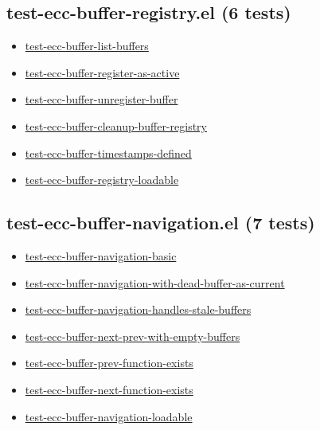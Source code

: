 \documentclass[11pt]{article}
\begin{document}
\subsection{test-ecc-buffer-registry.el (6 tests)}
\label{sec:orge17050b}
\begin{itemize}
\item \href{test-ecc-buffer-registry.el}{test-ecc-buffer-list-buffers}
\item \href{test-ecc-buffer-registry.el}{test-ecc-buffer-register-as-active}
\item \href{test-ecc-buffer-registry.el}{test-ecc-buffer-unregister-buffer}
\item \href{test-ecc-buffer-registry.el}{test-ecc-buffer-cleanup-buffer-registry}
\item \href{test-ecc-buffer-registry.el}{test-ecc-buffer-timestamps-defined}
\item \href{test-ecc-buffer-registry.el}{test-ecc-buffer-registry-loadable}
\end{itemize}
\subsection{test-ecc-buffer-navigation.el (7 tests)}
\label{sec:org1b0099a}
\begin{itemize}
\item \href{test-ecc-buffer-navigation.el}{test-ecc-buffer-navigation-basic}
\item \href{test-ecc-buffer-navigation.el}{test-ecc-buffer-navigation-with-dead-buffer-as-current}
\item \href{test-ecc-buffer-navigation.el}{test-ecc-buffer-navigation-handles-stale-buffers}
\item \href{test-ecc-buffer-navigation.el}{test-ecc-buffer-next-prev-with-empty-buffers}
\item \href{test-ecc-buffer-navigation.el}{test-ecc-buffer-prev-function-exists}
\item \href{test-ecc-buffer-navigation.el}{test-ecc-buffer-next-function-exists}
\item \href{test-ecc-buffer-navigation.el}{test-ecc-buffer-navigation-loadable}
\end{itemize}
\end{document}
